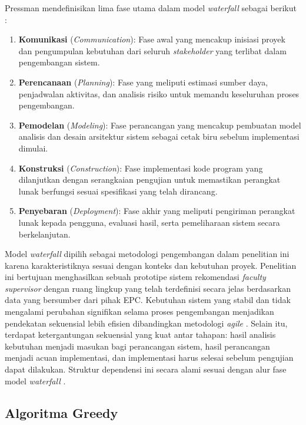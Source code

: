 Pressman mendefinisikan lima fase utama dalam model \textit{waterfall} sebagai berikut \cite{pressman2010se}:

\begin{enumerate}
    \item \textbf{Komunikasi} (\textit{Communication}): Fase awal yang mencakup inisiasi proyek dan pengumpulan kebutuhan dari seluruh \textit{stakeholder} yang terlibat dalam pengembangan sistem.
    \item \textbf{Perencanaan} (\textit{Planning}): Fase yang meliputi estimasi sumber daya, penjadwalan aktivitas, dan analisis risiko untuk memandu keseluruhan proses pengembangan.
    \item \textbf{Pemodelan} (\textit{Modeling}): Fase perancangan yang mencakup pembuatan model analisis dan desain arsitektur sistem sebagai cetak biru sebelum implementasi dimulai.
    \item \textbf{Konstruksi} (\textit{Construction}): Fase implementasi kode program yang dilanjutkan dengan serangkaian pengujian untuk memastikan perangkat lunak berfungsi sesuai spesifikasi yang telah dirancang.
    \item \textbf{Penyebaran} (\textit{Deployment}): Fase akhir yang meliputi pengiriman perangkat lunak kepada pengguna, evaluasi hasil, serta pemeliharaan sistem secara berkelanjutan.
\end{enumerate}

Model \textit{waterfall} dipilih sebagai metodologi pengembangan dalam penelitian ini karena karakteristiknya sesuai dengan konteks dan kebutuhan proyek. Penelitian ini bertujuan menghasilkan sebuah prototipe sistem rekomendasi \textit{faculty supervisor} dengan ruang lingkup yang telah terdefinisi secara jelas berdasarkan data yang bersumber dari pihak EPC. Kebutuhan sistem yang stabil dan tidak mengalami perubahan signifikan selama proses pengembangan menjadikan pendekatan sekuensial lebih efisien dibandingkan metodologi \textit{agile} \cite{saravanos2023waterfall}. Selain itu, terdapat ketergantungan sekuensial yang kuat antar tahapan: hasil analisis kebutuhan menjadi masukan bagi perancangan sistem, hasil perancangan menjadi acuan implementasi, dan implementasi harus selesai sebelum pengujian dapat dilakukan. Struktur dependensi ini secara alami sesuai dengan alur fase model \textit{waterfall} \cite{pargaonkar2023sdlc}.

\subsection{Algoritma Greedy}\label{algoritma-greedy}

